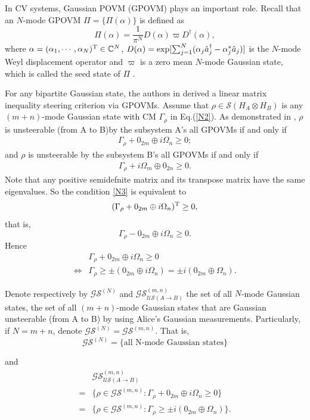 \documentclass[10pt,aps,pra,amsfonts,amssymb,amsmath,%
floatfix,nofootinbib, groupedaddress,superscriptaddress,citesort,twocolumn
]{revtex4}%
\begin{document}
 In CV systems, Gaussian POVM (GPOVM) plays an important role.
Recall that an
$N$-mode GPOVM
$\Pi=\{\Pi(\alpha)\}$  is defined  as
$$\Pi(\alpha)=\frac{1}{\pi^N}D(\alpha)\varpi
D^\dag(\alpha),$$ where $\alpha=(\alpha_1,\cdots, \alpha_N)^{\rm T} \in{\mathbb C^N}$, $D(\alpha)={\rm
	exp}[\sum_{j=1}^{N}(\alpha_j\hat{a}_j^\dag-\alpha_j^*\hat{a}_j)]$ is
the $N$-mode Weyl displacement operator and
$\varpi$  is a zero mean $N$-mode Gaussian state,
which is called the seed state of  $\Pi$ \cite{GC}.







For any bipartite Gaussian state, the authors in \cite{WJ}
derived a linear matrix inequality steering criterion via GPOVMs. Assume that $\rho\in{\mathcal S}(H_A\otimes H_B)$ is any $(m+n)$-mode Gaussian state with CM
$\Gamma_\rho$ in Eq.(\ref{N2}). As demonstrated in \cite{WJ},   $\rho$ is unsteerable (from A to B)by the subsystem
A's  all GPOVMs  if and only if
\begin{eqnarray}\label{N3}
	\Gamma_\rho+0_{2m}\oplus i\Omega_{n}\geq0;
\end{eqnarray}
and $\rho$ is unsteerable by the subsystem
B's all GPOVMs  if and only if
\begin{eqnarray*}%
\Gamma_\rho+i\Omega_{m}\oplus0_{2n} \geq0.
\end{eqnarray*}
 Note that  any positive semidefnite matrix and its transpose matrix have the same eigenvalues. So
the condition \eqref{N3} is equivalent to  $$(\Gamma_\rho+0_{2m}\oplus i\Omega_{n})^{\rm T}\geq 0,$$
that is,
$$\Gamma_\rho-0_{2m}\oplus i\Omega_{n}\geq 0.$$
Hence
 $$\begin{array}{rl}&\Gamma_\rho+0_{2m}\oplus i\Omega_{n}\geq0\\
 	\Leftrightarrow&\Gamma_\rho \ge \pm(0_{2m}\oplus i\Omega_{n}) =\pm i(0_{2m}\oplus \Omega_{n}).\end{array}$$  

Denote  respectively by ${\mathcal {GS}}^{(N)}$ and ${\mathcal  {GS}^{(m,n)}_{\mathcal {US}(A \rightarrow  B)}}$ the set of all  $N$-mode Gaussian states,   the set of all $(m+n)$-mode  Gaussian states that are Gaussian
unsteerable (from A to B) by using Alice’s Gaussian measurements.  Particularly, if $N=m+n$, denote ${\mathcal {GS}}^{(N)}={\mathcal {GS}}^{(m,n)}. $ That is,
$${\mathcal {GS}}^{(N)}
	=\{\mbox{all N-mode Gaussian states}\}$$

and
$$\begin{array}{rl}&{\mathcal  {GS}^{(m,n)}_{\mathcal {US}(A \rightarrow  B)}}\\
	=&\{\rho \in{\mathcal {GS}}^{(m,n)} :\Gamma_{\rho}+0_{2m}\oplus i\Omega_{n}\geq0\}\\
	=&\{\rho \in {\mathcal {GS}}^{(m,n)} :\Gamma_{\rho}\geq \pm i(0_{2m}\oplus \Omega_{n})\}.\end{array}$$
\end{document}
